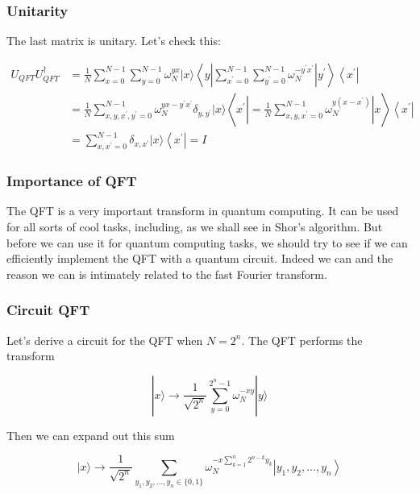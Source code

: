 \documentclass{beamer}
\begin{document}
\begin{frame}
\frametitle{Unitarity}

The last  matrix is unitary. Let's check this:

\begin{align*}
U_{Q F T} U_{Q F T}^{\dagger} & =\frac{1}{N} \sum_{x=0}^{N-1} \sum_{y=0}^{N-1} \omega_{N}^{y x}|x\rangle\left\langle y\left|\sum_{x^{\prime}=0}^{N-1} \sum_{y^{\prime}=0}^{N-1} \omega_{N}^{-y^{\prime} x^{\prime}}\right| y^{\prime}\right\rangle\left\langle x^{\prime}\right| \\
& =\frac{1}{N} \sum_{x, y, x^{\prime}, y^{\prime}=0}^{N-1} \omega_{N}^{y x-y^{\prime} x^{\prime}} \delta_{y, y^{\prime}}|x\rangle\left\langle x^{\prime}\left|=\frac{1}{N} \sum_{x, y, x^{\prime}=0}^{N-1} \omega_{N}^{y\left(x-x^{\prime}\right)}\right| x\right\rangle\left\langle x^{\prime}\right| \\
& =\sum_{x, x^{\prime}=0}^{N-1} \delta_{x, x^{\prime}}|x\rangle\left\langle x^{\prime}\right|=I 
\end{align*}
\end{frame}

\begin{frame}
\frametitle{Importance of QFT}

The QFT is a very important transform in quantum computing. It can be
used for all sorts of cool tasks, including, as we shall see in Shor's
algorithm. But before we can use it for quantum computing tasks, we
should try to see if we can efficiently implement the QFT with a
quantum circuit. Indeed we can and the reason we can is intimately
related to the fast Fourier transform.
\end{frame}

\begin{frame}
\frametitle{Circuit QFT}

Let's derive a circuit for the QFT when $N=2^{n}$. The QFT performs the transform

\begin{equation*}
|x\rangle \rightarrow \frac{1}{\sqrt{2^{n}}} \sum_{y=0}^{2^{n}-1} \omega_{N}^{-x y}|y\rangle 
\end{equation*}

Then we can expand out this sum

\begin{equation*}
|x\rangle \rightarrow \frac{1}{\sqrt{2^{n}}} \sum_{y_{1}, y_{2}, \ldots, y_{n} \in\{0,1\}} \omega_{N}^{-x \sum_{k=1}^{n} 2^{n-k} y_{k}}\left|y_{1}, y_{2}, \ldots, y_{n}\right\rangle 
\end{equation*}
\end{frame}
\end{document}
